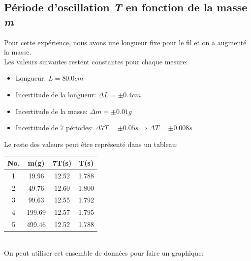\documentclass[12pt,a4paper]{article}
\begin{document}
    \subsection{Période d'oscillation \textit{T} en fonction de la masse \textit{m}}
    Pour cette expérience, nous avons une longueur fixe pour le fil et on a augmenté la masse. \\
    Les valeurs suivantes restent constantes pour chaque mesure:
    \begin{itemize}
        \item Longueur: $L=80.0cm$
        \item Incertitude de la longueur: $\Delta L=\pm 0.4cm$
        \item Incertitude de la masse: $\Delta m=\pm 0.01g$
        \item Incertitude de 7 périodes: $\Delta 7T=\pm 0.05s \Rightarrow \Delta T=\pm 0.008s$
    \end{itemize}
    Le reste des valeurs peut être représenté dans un tableau:
    \begin{table}[htbp]
        \centering
        \begin{minipage}{0.4\textwidth}
            \begin{tabular}{c|c|c|c}
                \textbf{No.} & \textbf{m(g)} & \textbf{7T(s)} & \textbf{T(s)} \\
                \toprule
                1 & 19.96 & 12.52 & 1.788 \\
                2 & 49.76 & 12.60 & 1.800 \\
                3 & 99.63 & 12.55 & 1.792 \\
                4 & 199.69 & 12.57 & 1.795 \\
                5 & 499.46 & 12.52 & 1.788 \\
            \end{tabular}
        \end{minipage}%
        \begin{minipage}{0.6\textwidth}
            \centering
        \end{minipage}
    \end{table} \\
    On peut utiliser cet ensemble de données pour faire un graphique:
\end{document}

